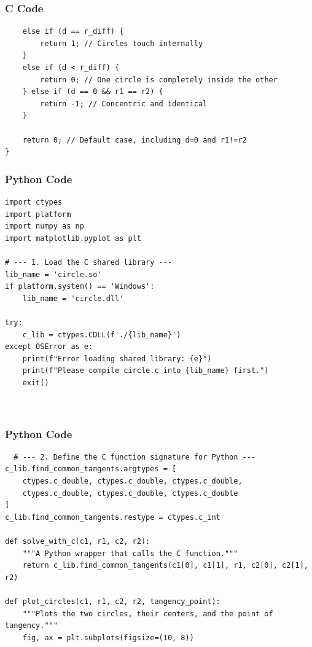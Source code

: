 \documentclass{beamer}
\begin{document}
    \begin{frame}[fragile]
        \frametitle{C Code}
        \begin{lstlisting}
    else if (d == r_diff) {
        return 1; // Circles touch internally
    } 
    else if (d < r_diff) {
        return 0; // One circle is completely inside the other
    } else if (d == 0 && r1 == r2) {
        return -1; // Concentric and identical
    }

    return 0; // Default case, including d=0 and r1!=r2
}
        \end{lstlisting}
    \end{frame}
    
   
    
    \begin{frame}[fragile]
        \frametitle{Python Code}
        \begin{lstlisting}
import ctypes
import platform
import numpy as np
import matplotlib.pyplot as plt

# --- 1. Load the C shared library ---
lib_name = 'circle.so'
if platform.system() == 'Windows':
    lib_name = 'circle.dll'

try:
    c_lib = ctypes.CDLL(f'./{lib_name}')
except OSError as e:
    print(f"Error loading shared library: {e}")
    print(f"Please compile circle.c into {lib_name} first.")
    exit()



        \end{lstlisting}
    \end{frame}
    
    \begin{frame}[fragile]
        \frametitle{Python Code}
        \begin{lstlisting}
  # --- 2. Define the C function signature for Python ---
c_lib.find_common_tangents.argtypes = [
    ctypes.c_double, ctypes.c_double, ctypes.c_double,
    ctypes.c_double, ctypes.c_double, ctypes.c_double
]
c_lib.find_common_tangents.restype = ctypes.c_int

def solve_with_c(c1, r1, c2, r2):
    """A Python wrapper that calls the C function."""
    return c_lib.find_common_tangents(c1[0], c1[1], r1, c2[0], c2[1], r2)

def plot_circles(c1, r1, c2, r2, tangency_point):
    """Plots the two circles, their centers, and the point of tangency."""
    fig, ax = plt.subplots(figsize=(10, 8))

   
        \end{lstlisting}
    \end{frame}
    
\end{document}

